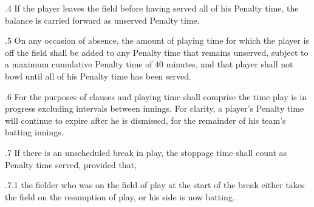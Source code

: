 \documentclass[12pt]{article}
\begin{document}
\vspace{\baselineskip}
\begin{adjustwidth}{0.5in}{0.18in}
{\fontsize{9pt}{10.8pt}.4 \tabto{0.49in} If the player leaves the field before having served all of his Penalty time, the balance is carried forward as unserved Penalty time.\par}\par

\end{adjustwidth}


\vspace{\baselineskip}
\begin{adjustwidth}{0.5in}{0.01in}
{\fontsize{9pt}{10.8pt}.5 \tabto{0.49in} On any occasion of absence, the amount of playing time for which the player is off the field shall be added to any Penalty time that remains unserved, subject to a maximum cumulative Penalty time of 40 minutes, and that player shall not bowl until all of his Penalty time has been served.\par}\par

\end{adjustwidth}


\vspace{\baselineskip}
\begin{adjustwidth}{0.5in}{0.15in}
{\fontsize{9pt}{10.8pt}.6 \tabto{0.49in} For the purposes of clauses and playing time shall comprise the time play is in progress excluding intervals between innings. For clarity, a player’s Penalty time will continue to expire after he is dismissed, for the remainder of his team’s batting innings.\par}\par

\end{adjustwidth}


\vspace{\baselineskip}
{\fontsize{9pt}{10.8pt}.7 \tabto{0.49in} If there is an unscheduled break in play, the stoppage time shall count as Penalty time served, provided that,\par}\par


\vspace{\baselineskip}
\begin{adjustwidth}{1.18in}{0.35in}
{\fontsize{9pt}{10.8pt}.7.1 \tabto{1.17in} the fielder who was on the field of play at the start of the break either takes the field on the resumption of play, or his side is now batting.\par}\par

\end{adjustwidth}
\end{document}
